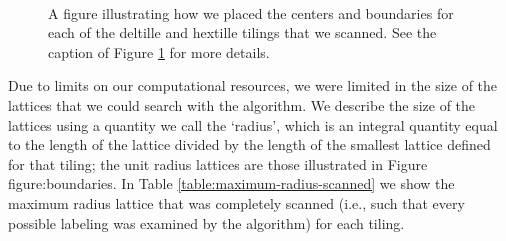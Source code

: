 \documentclass[12pt]{amsbook}
\theoremstyle{plain}
\theoremstyle{definition}
\theoremstyle{remark}
\begin{document}
\begin{figure}
\\
\caption{
\label{figure:boundaries2}
A figure illustrating how we placed the centers and boundaries for each of the deltille and hextille tilings that we scanned.  See the caption of Figure \ref{figure:boundaries2} for more details.
}
\end{figure}

Due to limits on our computational resources, we were limited in the size of the lattices that we could search with the algorithm.  We describe the size of the lattices using a quantity we call the `radius', which is an integral quantity equal to the length of the lattice divided by the length of the smallest lattice defined for that tiling;  the unit radius lattices are those illustrated in Figure {figure:boundaries}.  In Table \ref{table:maximum-radius-scanned} we show the maximum radius lattice that was completely scanned (i.e., such that every possible labeling was examined by the algorithm) for each tiling.
\end{document}
